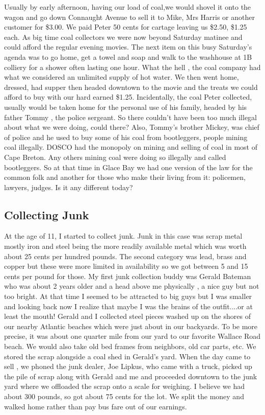 Usually by early afternoon, having our load of coal,we would shovel it onto the wagon and go down Connaught Avenue to sell it to Mike, Mrs Harris or another customer for \$3.00. We paid Peter 50 cents for cartage leaving us \$2.50, \$1.25 each. As big time coal collectors we were now beyond Saturday matinee and could afford the regular evening movies. The next item on this busy Saturday's agenda was to go home, get a towel and soap and walk to the washhouse at 1B colliery for a shower often lasting one hour. What the hell , the coal company had what we considered an unlimited supply of hot water. We then went home, dressed, had supper then headed downtown to the movie and the treats we could afford to buy with our hard earned \$1.25. Incidentally, the coal Peter collected, usually would be taken home for the personal use of his family, headed by his father Tommy , the police sergeant. So there couldn't have been too much illegal about what we were doing, could there? Also, Tommy's brother Mickey, was chief of police and he used to buy some of his coal from bootleggers, people mining coal illegally. DOSCO had the monopoly on mining and selling of coal in most of Cape Breton. Any others mining coal were doing so illegally and called bootleggers. So at that time in Glace Bay we had one version of the law for the common folk and another for those who make their living from it: policemen, lawyers, judges. Is it any different today?

\subsection{Collecting Junk}

At the age of 11, I started to collect junk. Junk in this case was scrap metal mostly iron and steel being the more readily available metal which was worth about 25 cents per hundred pounds. The second category was lead, brass and copper but these were more limited in availability so we got between 5 and 15 cents per pound for those. 
My first junk collection buddy was Gerald Bateman who was about 2 years older and a head above me physically , a nice guy but not too bright. At that time I seemed to be attracted to big guys but I was smaller and looking back now I realize that maybe I was the brains of the outfit....or at least the mouth! Gerald and I collected steel pieces washed up on the shores of our nearby Atlantic beaches which were just about in our backyards. To be more precise, it was about one quarter mile from our yard to our favorite Wallace Road beach. We would also take old bed frames from neighbors, old car parts, etc. We stored the scrap alongside a coal shed in Gerald's yard. When the day came to sell , we phoned the junk dealer, Joe Lipkus, who came with a truck, picked up the pile of scrap along with Gerald and me and proceeded downtown to the junk yard where we offloaded the scrap onto a scale for weighing. I believe we had about 300 pounds, so got about 75 cents for the lot. We split the money and walked home rather than pay bus fare out of our earnings.

